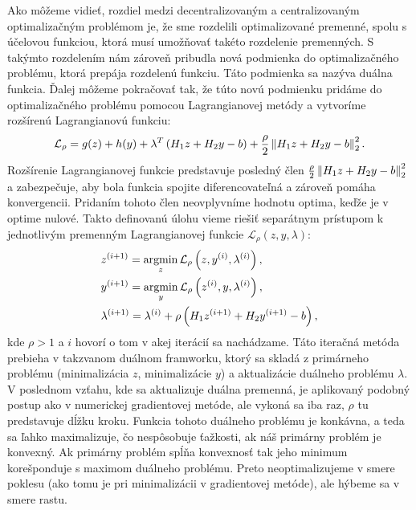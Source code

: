 Ako môžeme vidieť, rozdiel medzi decentralizovaným a centralizovaným optimalizačným problémom je, že sme rozdelili optimalizované premenné, spolu s účelovou funkciou, ktorá musí umožňovať takéto rozdelenie premenných. S takýmto rozdelením nám zároveň pribudla nová podmienka do optimalizačného problému, ktorá prepája rozdelenú funkciu. Táto podmienka sa nazýva duálna funkcia. 
Ďalej môžeme pokračovať tak, že túto novú podmienku pridáme do optimalizačného problému pomocou Lagrangianovej metódy a vytvoríme rozšírenú Lagrangianovú funkciu:
\begin{equation}
	\mathcal{L}_{\rho} = g(z) + h(y) + \lambda^{T}\left(  H_{1}z + H_{2}y - b \right) + \frac{\rho}{2} \left\lVert H_{1}z + H_{2}y - b\right\rVert_{2}^{2}.
\end{equation}
Rozšírenie Lagrangianovej funkcie predstavuje posledný člen $\frac{\rho}{2} \left\lVert H_{1}z + H_{2}y - b\right\rVert_{2}^{2}$ a zabezpečuje, aby bola funkcia spojite diferencovateľná a zároveň pomáha konvergencii. Pridaním tohoto člen neovplyvníme hodnotu optima, keďže je v optime nulové. Takto definovanú úlohu vieme riešiť separátnym prístupom k jednotlivým premenným Lagrangianovej funkcie $\mathcal{L}_{\rho} \left(z,y,\lambda \right)$:
\label{math:ADMM_iteracie}
\begin{subequations}
	\begin{align}
		&z^{(i+1)} = \operatorname*{argmin}_{z} \mathcal{L}_{\rho} \left(z,y^{(i)},\lambda^{(i)} \right),\\
		&y^{(i+1)} = \operatorname*{argmin}_{y} \mathcal{L}_{\rho} \left(z^{(i)},y,\lambda^{(i)} \right),\\
		&\lambda^{(i+1)} = \lambda^{(i)} + \rho\left( H_{1}z^{(i+1)} + H_{2}y^{(i+1)} - b \right),
	\end{align}
\end{subequations}
kde $\rho > 1$ a $i$ hovorí o tom v akej iterácií sa nachádzame. Táto iteračná metóda prebieha v takzvanom duálnom framworku, ktorý sa skladá z primárneho problému (minimalizácia $z$, minimalizácie $y$) a aktualizácie duálneho problému $\lambda$. V poslednom vzťahu, kde sa aktualizuje duálna premenná, je aplikovaný podobný postup ako v numerickej gradientovej metóde, ale vykoná sa iba raz, $\rho$ tu predstavuje dĺžku kroku. Funkcia tohoto duálneho problému je konkávna, a teda sa ľahko maximalizuje, čo nespôsobuje ťažkosti, ak náš primárny problém je konvexný. Ak primárny problém spĺňa konvexnosť tak jeho minimum korešponduje s maximom duálneho problému. Preto neoptimalizujeme v smere poklesu (ako tomu je pri minimalizácii v gradientovej metóde), ale hýbeme sa v smere rastu\cite{bib1}. 
\label{subse:ADMM2}

